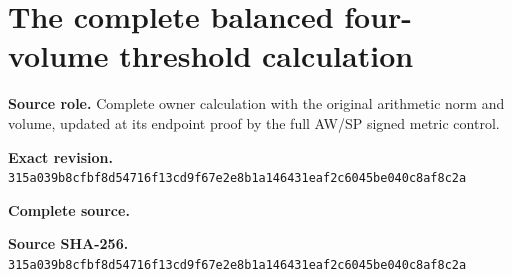 \begingroup
\sloppy
\small
\section{The complete balanced four-volume threshold calculation}
\noindent\textbf{Source role.} Complete owner calculation with the original arithmetic norm and volume, updated at its endpoint proof by the full AW/SP signed metric control.\par
\noindent\textbf{Exact revision.} \nolinkurl{315a039b8cfbf8d54716f13cd9f67e2e8b1a146431eaf2c6045be040c8af8c2a}\par
\noindent\textbf{Complete source.} \par
\noindent\textbf{Source SHA-256.} \nolinkurl{315a039b8cfbf8d54716f13cd9f67e2e8b1a146431eaf2c6045be040c8af8c2a}\par\medskip

\endgroup
